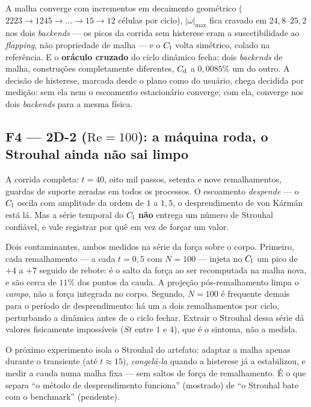 A malha converge com incrementos em decaimento geométrico ($2223 \to 1245 \to
\dots \to 15 \to 12$ células por ciclo), $|\omega|_{\max}$ fica cravado em
$24{,}8$--$25{,}2$ nos dois \emph{backends} --- os picos da corrida sem
histerese eram a suscetibilidade ao \emph{flapping}, não propriedade de malha
--- e o $C_{\mathrm{l}}$ volta simétrico, colado na referência. E o \textbf{oráculo
cruzado} do ciclo dinâmico fecha: dois \emph{backends} de malha, construções
completamente diferentes, $C_{\mathrm{d}}$ a $0{,}0085\%$ um do outro. A decisão de
histerese, marcada desde o plano como do usuário, chega decidida por medição:
sem ela nem o escoamento estacionário converge; com ela, converge nos dois
\emph{backends} para a mesma física.

\subsection{F4 --- 2D-2 (\texorpdfstring{$\mathrm{Re}=100$}{Re=100}): a máquina roda, o Strouhal ainda não sai limpo}

A corrida completa: $t=40$, oito mil passos, setenta e nove remalhamentos,
guardas de suporte zeradas em todos os processos. O escoamento \emph{despende}
--- o $C_{\mathrm{l}}$ oscila com amplitude da ordem de $1$ a $1{,}5$, o desprendimento de
von Kármán está lá. Mas a série temporal do $C_{\mathrm{l}}$ \textbf{não} entrega um número
de Strouhal confiável, e vale registrar por quê em vez de forçar um valor.

Dois contaminantes, ambos medidos na série da força sobre o corpo. Primeiro,
cada remalhamento --- a cada $t=0{,}5$ com $N=100$ --- injeta no $C_{\mathrm{l}}$ um pico
de $+4$ a $+7$ seguido de rebote: é o salto da força ao ser recomputada na malha
nova, e são cerca de $11\%$ dos pontos da cauda. A projeção pós-remalhamento
limpa o \emph{campo}, não a força integrada no corpo. Segundo, $N=100$ é
frequente demais para o período de desprendimento: há um a dois remalhamentos
por ciclo, perturbando a dinâmica antes de o ciclo fechar. Extrair o Strouhal
dessa série dá valores fisicamente impossíveis ($St$ entre $1$ e $4$), que é o
sintoma, não a medida.

O próximo experimento isola o Strouhal do artefato: adaptar a malha apenas
durante o transiente (até $t \approx 15$), \emph{congelá-la} quando a histerese
já a estabilizou, e medir a cauda numa malha fixa --- sem saltos de força de
remalhamento. É o que separa ``o método de desprendimento funciona'' (mostrado)
de ``o Strouhal bate com o benchmark'' (pendente).
